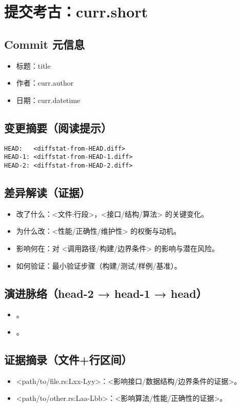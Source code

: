 \section{提交考古：{curr.short}}

\subsection*{Commit 元信息}
\begin{itemize}
  \item 标题：{title}
  \item 作者：{curr.author}
  \item 日期：{curr.datetime}
\end{itemize}

\subsection*{变更摘要（阅读提示）}
\begin{verbatim}
HEAD:   <diffstat-from-HEAD.diff>
HEAD-1: <diffstat-from-HEAD-1.diff>
HEAD-2: <diffstat-from-HEAD-2.diff>
\end{verbatim}

\subsection*{差异解读（证据）}
\begin{itemize}
  \item 改了什么：<文件:行段>，<接口/结构/算法> 的关键变化。
  \item 为什么改：<性能/正确性/维护性> 的权衡与动机。
  \item 影响何在：对 <调用路径/构建/边界条件> 的影响与潜在风险。
  \item 如何验证：最小验证步骤（构建/测试/样例/基准）。
\end{itemize}

\subsection*{演进脉络（head-2 → head-1 → head）}
\begin{itemize}
  \item <阶段与取舍 1>。
  \item <阶段与取舍 2>。
\end{itemize}

\subsection*{证据摘录（文件+行区间）}
\begin{itemize}
  \item <path/to/file.rs:Lxx-Lyy>：<影响接口/数据结构/边界条件的证据>。
  \item <path/to/other.rs:Laa-Lbb>：<影响算法/性能/正确性的证据>。
\end{itemize}

